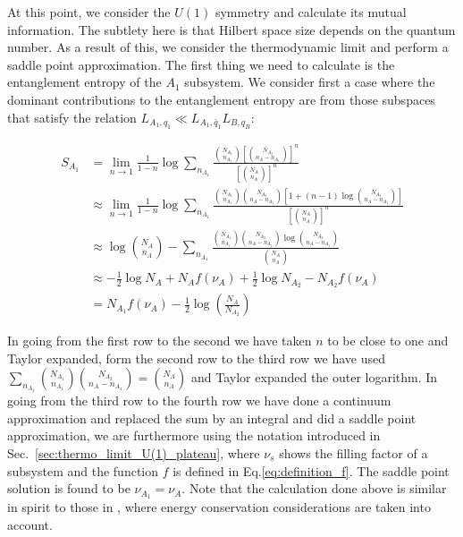 \documentclass[aps,pra,reprint,superscriptaddress,twocolumn,notitlepage]{revtex4-1}
\numberwithin{equation}{section}
\begin{document}
At this point, we consider the $U(1)$ symmetry and calculate its mutual information. The subtlety here is that Hilbert space size depends on the quantum number. As a result of this, we consider the thermodynamic limit and perform a saddle point approximation. The first thing we need to calculate is the entanglement entropy of the $A_1$ subsystem. We consider first a case where the dominant contributions to the entanglement entropy are from those subspaces that satisfy the relation $L_{A_1,q_1} \ll L_{A_1,\bar{q}_1} L_{B,q_B}$:
\begin{widetext}
\begin{equation}
\begin{aligned}
    S_{A_1} &= \lim_{n \to 1} \frac{1}{1-n} \log \sum_{n_{A_1}} \frac{\binom{N_{A_1}}{n_{A_1}} \left[ \binom{N_{A_2}}{n_A-n_{A_1}} \right]^n}{ \left[ \binom{N_A}{n_A} \right]^n }\\
    & \approx \lim_{n \to 1} \frac{1}{1-n} \log \sum_{n_{A_1}}
    \frac{\binom{N_{A_1}}{n_{A_1}} \binom{N_{A_2}}{n_A-n_{A_1}} \left[ 1+ (n-1) \log\binom{N_{A_2}}{n_A-n_{A_1}} \right]
    }{     \left[ \binom{N_A}{n_A} \right]^n }\\
    & \approx \log\binom{N_A}{n_A} - \sum_{n_{A_1}} \frac{\binom{N_{A_1}}{n_{A_1}} \binom{N_{A_2}}{n_A-n_{A_1}}   \log\binom{N_{A_2}}{n_A-n_{A_1}} 
    }{      \binom{N_A}{n_A} } \\
    & \approx  -\frac12 \log N_A + N_{A} f(\nu_A) + \frac12 \log N_{A_2} - N_{A_2} f(\nu_A)  \\
    & = N_{A_1} f(\nu_A) - \frac12 \log \left(\frac{N_{A}}{N_{A_2}} \right)
\end{aligned}
\end{equation}
\end{widetext}
In going from the first row to the second we have taken $n$ to be close to one and Taylor expanded, form the second row to the third row we have used $\sum_{n_{A_1}} \binom{N_{A_1}}{n_{A_1}} \binom{N_{A_2}}{n_A-n_{A_1}} = \binom{N_{A}}{n_{A}}$ and Taylor expanded the outer logarithm. In going from the third row to the fourth row we have done a continuum approximation and replaced the sum by an integral and did a saddle point approximation, we are furthermore using the notation introduced in Sec.~\ref{sec:thermo_limit_U(1)_plateau}, where $\nu_s$ shows the filling factor of a subsystem and the function $f$ is defined in Eq.\eqref{eq:definition_f}. The saddle point solution is found to be $\nu_{A_1} = \nu_A$. Note that the calculation done above is similar in spirit to those in \cite{murthy2019structure}, where energy conservation considerations are taken into account.
\end{document}
